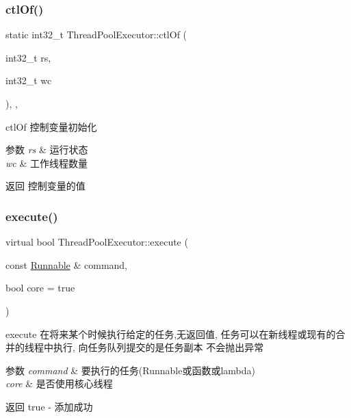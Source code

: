 \subsubsection{\texorpdfstring{ctl\+Of()}{ctlOf()}}
{\footnotesize\ttfamily static int32\+\_\+t Thread\+Pool\+Executor\+::ctl\+Of (\begin{DoxyParamCaption}\item[{int32\+\_\+t}]{rs,  }\item[{int32\+\_\+t}]{wc }\end{DoxyParamCaption})\hspace{0.3cm}{\ttfamily [inline]}, {\ttfamily [static]}, {\ttfamily [protected]}}



ctl\+Of 控制变量初始化 


\begin{DoxyParams}{参数}
{\em rs} & 运行状态 \\
\hline
{\em wc} & 工作线程数量\\
\hline
\end{DoxyParams}
\begin{DoxyReturn}{返回}
控制变量的值 
\end{DoxyReturn}
\mbox{\label{classThreadPoolExecutor_adb3c813875b9abfad2e6d67dabab2d53}} 
\subsubsection{\texorpdfstring{execute()}{execute()}\hspace{0.1cm}{\footnotesize\ttfamily [1/2]}}
{\footnotesize\ttfamily virtual bool Thread\+Pool\+Executor\+::execute (\begin{DoxyParamCaption}\item[{const \hyperlink{classRunnable}{Runnable} \&}]{command,  }\item[{bool}]{core = {\ttfamily true} }\end{DoxyParamCaption})\hspace{0.3cm}{\ttfamily [virtual]}}



execute 在将来某个时候执行给定的任务,无返回值, 任务可以在新线程或现有的合并的线程中执行, 向任务队列提交的是任务副本 不会抛出异常 


\begin{DoxyParams}{参数}
{\em command} & 要执行的任务(Runnable或函数或lambda) \\
\hline
{\em core} & 是否使用核心线程\\
\hline
\end{DoxyParams}
\begin{DoxyReturn}{返回}
true -\/ 添加成功 
\end{DoxyReturn}
\mbox{\label{classThreadPoolExecutor_ae24770a14741a5d320da4cc78f01c2d6}} 
